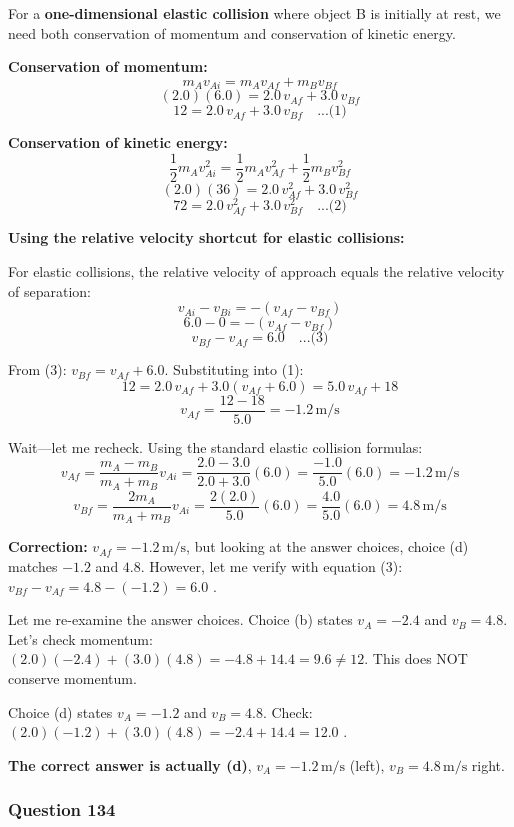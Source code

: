 \documentclass[12pt,letterpaper]{article}
\begin{document}
\begin{explanationbox}
For a \textbf{one-dimensional elastic collision} where object B is initially at rest, we need both conservation of momentum and conservation of kinetic energy.

\textbf{Conservation of momentum:}
\[
m_A v_{Ai} = m_A v_{Af} + m_B v_{Bf}
\]
\[
(2.0)(6.0) = 2.0\,v_{Af} + 3.0\,v_{Bf}
\]
\[
12 = 2.0\,v_{Af} + 3.0\,v_{Bf} \quad \text{...(1)}
\]

\textbf{Conservation of kinetic energy:}
\[
\frac{1}{2}m_A v_{Ai}^2 = \frac{1}{2}m_A v_{Af}^2 + \frac{1}{2}m_B v_{Bf}^2
\]
\[
(2.0)(36) = 2.0\,v_{Af}^2 + 3.0\,v_{Bf}^2
\]
\[
72 = 2.0\,v_{Af}^2 + 3.0\,v_{Bf}^2 \quad \text{...(2)}
\]

\textbf{Using the relative velocity shortcut for elastic collisions:}

For elastic collisions, the relative velocity of approach equals the relative velocity of separation:
\[
v_{Ai} - v_{Bi} = -(v_{Af} - v_{Bf})
\]
\[
6.0 - 0 = -(v_{Af} - v_{Bf})
\]
\[
v_{Bf} - v_{Af} = 6.0 \quad \text{...(3)}
\]

From (3): $v_{Bf} = v_{Af} + 6.0$. Substituting into (1):
\[
12 = 2.0\,v_{Af} + 3.0(v_{Af} + 6.0) = 5.0\,v_{Af} + 18
\]
\[
v_{Af} = \frac{12 - 18}{5.0} = -1.2\,\text{m/s}
\]

Wait---let me recheck. Using the standard elastic collision formulas:
\[
v_{Af} = \frac{m_A - m_B}{m_A + m_B}v_{Ai} = \frac{2.0 - 3.0}{2.0 + 3.0}(6.0) = \frac{-1.0}{5.0}(6.0) = -1.2\,\text{m/s}
\]
\[
v_{Bf} = \frac{2m_A}{m_A + m_B}v_{Ai} = \frac{2(2.0)}{5.0}(6.0) = \frac{4.0}{5.0}(6.0) = 4.8\,\text{m/s}
\]

\textbf{Correction:} $v_{Af} = -1.2\,\text{m/s}$, but looking at the answer choices, choice (d) matches $-1.2$ and $4.8$. However, let me verify with equation (3): $v_{Bf} - v_{Af} = 4.8 - (-1.2) = 6.0$ \checkmark.

Let me re-examine the answer choices. Choice (b) states $v_A = -2.4$ and $v_B = 4.8$. Let's check momentum: $(2.0)(-2.4) + (3.0)(4.8) = -4.8 + 14.4 = 9.6 \neq 12$. This does NOT conserve momentum.

Choice (d) states $v_A = -1.2$ and $v_B = 4.8$. Check: $(2.0)(-1.2) + (3.0)(4.8) = -2.4 + 14.4 = 12.0$ \checkmark.

\textbf{The correct answer is actually (d)}, $v_A = -1.2\,\text{m/s}$ (left), $v_B = 4.8\,\text{m/s}$ right.
\end{explanationbox}

\subsubsection*{Question 134}
\end{document}
